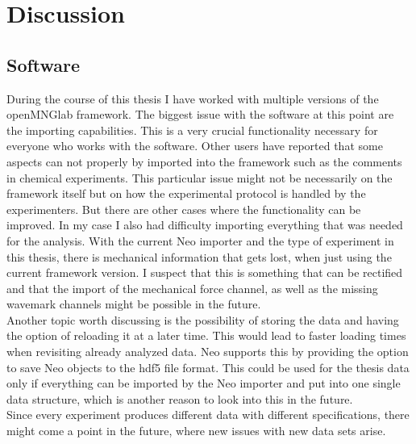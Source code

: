 \chapter{Discussion}
\begin{comment}
-speak about the problems with the software
- what needs to be fixed


-analysis:
-threshold, already mentioned in Robertos paper
-active nerve fiber has decreased response
-not linear

hdf5 not yet feasible, since we get 3 separate data structures and not one single concise format.


In this chapter I will discuss the results presented in the previous chapter and think about possible future work regarding the analysis. Also I will discuss the integration of my code (quantifiers mainly) into openMNGlab and thoughts about the structuring of the software.
\end{comment}
\section{Software}
During the course of this thesis I have worked with multiple versions of the openMNGlab framework. The biggest issue with the software at this point are the importing capabilities. This is a very crucial functionality necessary for everyone who works with the software. Other users have reported that some aspects can not properly by imported into the framework such as the comments in chemical experiments. This particular issue might not be necessarily on the framework itself but on how the experimental protocol is handled by the experimenters. But there are other cases where the functionality can be improved. In my case I also had difficulty importing everything that was needed for the analysis. With the current Neo importer and the type of experiment in this thesis, there is mechanical information that gets lost, when just using the current framework version. I suspect that this is something that can be rectified and that the import of the mechanical force channel, as well as the missing wavemark channels might be possible in the future. \\
Another topic worth discussing is the possibility of storing the data and having the option of reloading it at a later time. This would lead to faster loading times when revisiting already analyzed data. Neo supports this by providing the option to save Neo objects to the hdf5 file format. This could be used for the thesis data only if everything can be imported by the Neo importer and put into one single data structure, which is another reason to look into this in the future. \\
Since every experiment produces different data with different specifications, there might come a point in the future, where new issues with new data sets arise.

